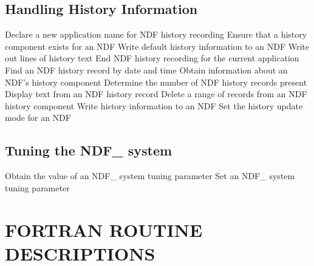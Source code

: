 \subsection{Handling History Information}

            {Declare a new application name for NDF history recording}
            {Ensure that a history component exists for an NDF}
            {Write default history information to an NDF}
            {Write out lines of history text}
            {End NDF history recording for the current application}
            {Find an NDF history record by date and time}
            {Obtain information about an NDF's history component}
            {Determine the number of NDF history records present}
            {Display text from an NDF history record}
            {Delete a range of records from an NDF history component}
            {Write history information to an NDF}
            {Set the history update mode for an NDF}

\subsection{Tuning the NDF\_ system}

            {Obtain the value of an NDF\_ system tuning parameter}
            {Set an NDF\_ system tuning parameter}

\newpage
\section{\label{ss:routinedescriptions}FORTRAN ROUTINE DESCRIPTIONS}

